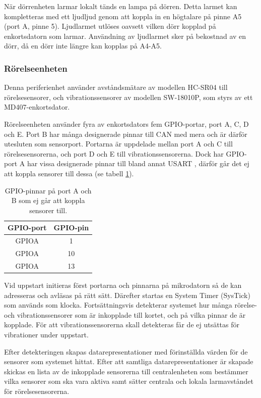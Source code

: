 \documentclass{article}
\begin{document}
När dörrenheten larmar lokalt tänds en lampa på dörren. Detta larmet kan kompletteras med ett  ljudljud
genom att koppla in en högtalare på pinne A5 (port A, pinne 5). Ljudlarmet utlöses oavsett vilken dörr kopplad på enkortsdatorn som larmar. Användning av ljudlarmet sker på bekostnad av en dörr, då en dörr inte längre kan kopplas på A4-A5. 


\subsubsection{Rörelseenheten}
Denna periferienhet använder avståndsmätare av modellen HC-SR04\cite{HC-SR04} till rörelsesensorer,
 och vibrationssensorer av modellen SW-18010P\cite{SW-18010P}, som styrs av ett MD407-enkortsdator.

Rörelseenheten använder fyra av enkortsdators fem GPIO-portar, port A, C, D och E. 
Port B har många designerade pinnar till CAN med mera och är därför utesluten som 
sensorport. Portarna är uppdelade mellan port A och C till rörelsesensorerna,
och port D och E till vibrationssensorerna. Dock har GPIO-port A har vissa designerade pinnar 
till bland annat USART , därför går det ej att koppla sensorer till dessa (se tabell \ref{tab:Ogiltliga pinnar}).

\begin{table}[htbp]
	\centering
	\begin{tabular}{|c|c|} \hline
		GPIO-port & GPIO-pin \\ \hline \hline
		GPIOA & 1 \\ \hline
		GPIOA & 10 \\ \hline
		GPIOA & 13 \\ \hline
	\end{tabular}
	\caption{GPIO-pinnar på port A och B som ej går att koppla sensorer till.}
	\label{tab:Ogiltliga pinnar}
\end{table}

Vid uppstart initieras först portarna och pinnarna på mikrodatorn så de kan adresseras och avläsas på rätt sätt. Därefter startas en System Timer (SysTick) som används som klocka.
Fortsättningsvis detekterar systemet hur många rörelse- och vibrationssensorer som är inkopplade till kortet, och på vilka pinnar de är kopplade. För att vibrationssensorerna skall detekteras får de ej utsättas för vibrationer under uppstart.

Efter detekteringen skapas datarepresentationer med förinställda värden för de
sensorer som systemet hittat. Efter att samtliga datarepresentationer är skapade skickas
en lista av de inkopplade sensorerna till centralenheten som bestämmer vilka sensorer som ska vara aktiva
samt sätter centrala och lokala larmavståndet för rörelsesensorerna.
\end{document}
